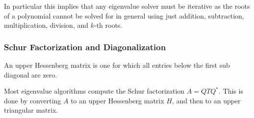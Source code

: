 \documentclass[12pt]{article}
\begin{document}
In particular this implies that any eigenvalue solver must be iterative as the roots of a polynomial cannot be solved for in general using just addition, subtraction, multiplication, division, and \( k \)-th roots.

\subsubsection{Schur Factorization and Diagonalization}

\begin{definition}
An upper Hessenberg matrix is one for which all entries below the first sub diagonal are zero.
\end{definition}

Most eigenvalue algorithms compute the Schur factorization \( A = QTQ^* \). This is done by converting \( A \) to an upper Hessenberg matrix \( H \), and then to an upper triangular matrix.
\end{document}
